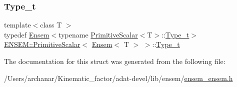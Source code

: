 \subsubsection{\texorpdfstring{Type\_t}{Type\_t}\hspace{0.1cm}{\footnotesize\ttfamily [3/3]}}
{\footnotesize\ttfamily template$<$class T $>$ \\
typedef \mbox{\hyperlink{classENSEM_1_1Ensem}{Ensem}}$<$typename \mbox{\hyperlink{structENSEM_1_1PrimitiveScalar}{Primitive\+Scalar}}$<$T$>$\+::\mbox{\hyperlink{structENSEM_1_1PrimitiveScalar_3_01Ensem_3_01T_01_4_01_4_af9a7554dcb219c3d60465d27682b73bf}{Type\+\_\+t}}$>$ \mbox{\hyperlink{structENSEM_1_1PrimitiveScalar}{E\+N\+S\+E\+M\+::\+Primitive\+Scalar}}$<$ \mbox{\hyperlink{classENSEM_1_1Ensem}{Ensem}}$<$ T $>$ $>$\+::\mbox{\hyperlink{structENSEM_1_1PrimitiveScalar_3_01Ensem_3_01T_01_4_01_4_af9a7554dcb219c3d60465d27682b73bf}{Type\+\_\+t}}}



The documentation for this struct was generated from the following file\+:\begin{DoxyCompactItemize}
\item 
/\+Users/archanar/\+Kinematic\+\_\+factor/adat-\/devel/lib/ensem/\mbox{\hyperlink{adat-devel_2lib_2ensem_2ensem__ensem_8h}{ensem\+\_\+ensem.\+h}}\end{DoxyCompactItemize}
